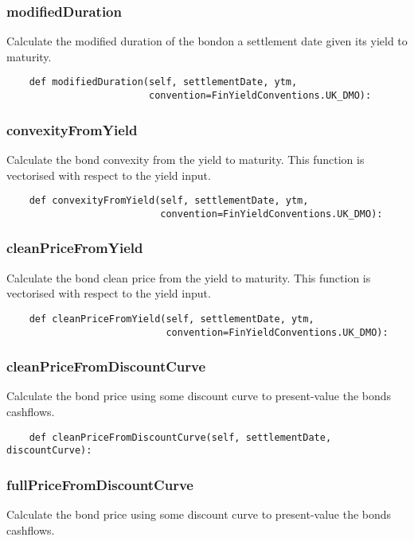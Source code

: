 \documentclass[twoside,11pt]{book}
\begin{document}
\subsubsection*{{\bf modifiedDuration}}
Calculate the modified duration of the bondon a settlement date given its yield to maturity.  

\begin{lstlisting}
    def modifiedDuration(self, settlementDate, ytm,
                         convention=FinYieldConventions.UK_DMO):
\end{lstlisting}

\subsubsection*{{\bf convexityFromYield}}
Calculate the bond convexity from the yield to maturity. This function is vectorised with respect to the yield input.  

\begin{lstlisting}
    def convexityFromYield(self, settlementDate, ytm,
                           convention=FinYieldConventions.UK_DMO):
\end{lstlisting}

\subsubsection*{{\bf cleanPriceFromYield}}
Calculate the bond clean price from the yield to maturity. This function is vectorised with respect to the yield input.  

\begin{lstlisting}
    def cleanPriceFromYield(self, settlementDate, ytm,
                            convention=FinYieldConventions.UK_DMO):
\end{lstlisting}

\subsubsection*{{\bf cleanPriceFromDiscountCurve}}
Calculate the bond price using some discount curve to present-value the bonds cashflows.  

\begin{lstlisting}
    def cleanPriceFromDiscountCurve(self, settlementDate, discountCurve):
\end{lstlisting}

\subsubsection*{{\bf fullPriceFromDiscountCurve}}
Calculate the bond price using some discount curve to present-value the bonds cashflows.  
\end{document}
